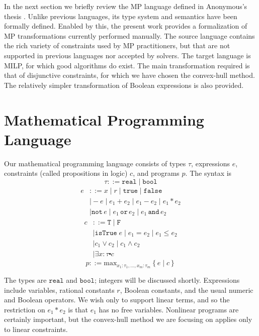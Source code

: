 \documentclass[preprint]{sigplanconf}%
\theoremstyle{remark}
\begin{document}
In the next section we briefly review the MP language defined in Anonymous's
thesis \cite{a3000}. Unlike previous languages, its type system and semantics
have been formally defined. Enabled by this, the present work provides a
formalization of MP transformations currently performed manually. The source
language contains the rich variety of constraints used by MP practitioners,
but that are not supported in previous languages nor accepted by solvers. The
target language is MILP, for which good algorithms do exist. The main
transformation required is that of disjunctive constraints, for which we have
chosen the convex-hull method. The relatively simpler transformation of
Boolean expressions is also provided.

\section{Mathematical Programming Language}

Our mathematical programming language consists of types $\tau$, expressions
$e$, constraints (called propositions in logic) $c$, and programs $p$. The
syntax is%
\begin{equation}
\tau::=\mathtt{real}\mid\mathtt{bool}%
\end{equation}%
\begin{align}
e  &  ::=x\mid r\mid\mathtt{true}\mid\mathtt{false}\nonumber\\
&  \mid-e\mid e_{1}+e_{2}\mid e_{1}-e_{2}\mid e_{1}\ast e_{2}\nonumber\\
&  \mid\mathtt{not}\,e\mid e_{1}\,\mathtt{or}\,e_{2}\mid e_{1}\,\mathtt{and}%
\,e_{2}%
\end{align}%
\begin{align}
c  &  ::=\mathtt{T}\mid\mathtt{F}\nonumber\\
&  \mid\mathtt{isTrue}\;e\mid e_{1}=e_{2}\mid e_{1}\leq e_{2}\nonumber\\
&  \mid c_{1}\vee c_{2}\mid c_{1}\wedge c_{2}\nonumber\\
&  \mid\exists x\!:\!\tau\centerdot c
\end{align}%
\begin{equation}
p::=\mathrm{max}_{x_{1}:\tau_{1},\ldots,x_{m}:\tau_{m}}\left\{  e\mid
c\right\}
\end{equation}


The types are $\mathtt{real}$ and $\mathtt{bool}$; integers will be discussed
shortly. Expressions include variables, rational constants $r$, Boolean
constants, and the usual numeric and Boolean operators. We wish only to
support linear terms, and so the restriction on $e_{1}\ast e_{2}$ is that
$e_{1}$ has no free variables. Nonlinear programs are certainly important, but
the convex-hull method we are focusing on applies only to linear constraints.
\end{document}

